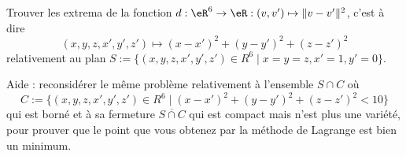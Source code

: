 
\begin{exercice}\label{exoVariete0004}

Trouver les extrema de la fonction $d:\eR^6 \rightarrow \eR: (v,v') \mapsto \|v-v'\|^2$, c'est à dire
\begin{equation}
	(x,y,z,x',y',z') \mapsto (x-x')^2+(y-y')^2+(z- z')^2
\end{equation}
relativement au plan $S :=\{ (x,y,z,x',y',z') \in R^6 \mid x=y=z, x'=1, y'=0 \}$.

Aide : reconsidérer le même problème relativement à l'ensemble $S\cap C$ où
\begin{equation}
	C :=\{ (x,y,z,x',y',z') \in R^6 \mid (x-x')^2+(y-y')^2+(z- z')^2<10 \}
\end{equation}
qui est borné et à sa fermeture $\overline{S \cap C}$ qui est compact mais n'est plus une variété, pour prouver que le point que vous obtenez par la méthode de Lagrange est bien un minimum.


\end{exercice}
